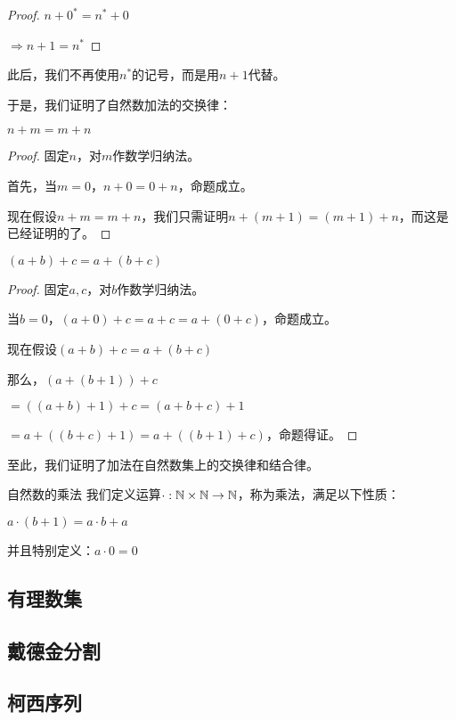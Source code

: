 \documentclass[12pt, a4paper, oneside, UTF8]{ctexbook}
\begin{document}
\begin{para}{0}
\begin{proof}
						$n+0^*=n^*+0$
						
						$\Rightarrow n+1=n^*$
					\end{proof}
					此后，我们不再使用$n^*$的记号，而是用$n+1$代替。
					
					于是，我们证明了自然数加法的交换律：
					\begin{proposition}
						$n+m=m+n$
					\end{proposition}
					\begin{proof}
						固定$n$，对$m$作数学归纳法。
						
						首先，当$m=0$，$n+0=0+n$，命题成立。
						
						现在假设$n+m=m+n$，我们只需证明$n+(m+1)=(m+1)+n$，而这是已经证明的了。
					\end{proof}
					\begin{proposition}
						$(a+b)+c=a+(b+c)$
					\end{proposition}
					\begin{proof}
						固定$a,c$，对$b$作数学归纳法。
						
						当$b=0$，$(a+0)+c=a+c=a+(0+c)$，命题成立。
						
						现在假设$(a+b)+c=a+(b+c)$
						
						那么，$\left(a+(b+1)\right)+c$
						
						$=\left((a+b)+1\right)+c=(a+b+c)+1$
						
						$=a+\left((b+c)+1\right)=a+\left((b+1)+c\right)$，命题得证。
					\end{proof}
					至此，我们证明了加法在自然数集上的交换律和结合律。
					\begin{defn}{自然数的乘法}
						我们定义运算$\cdot : \mathbb{N} \times \mathbb{N} \rightarrow \mathbb{N}$，称为乘法，满足以下性质：
						
						$a \cdot (b+1) = a\cdot b + a$
						
						并且特别定义：$a \cdot 0 = 0$
					\end{defn}
			\end{para}
		\subsection{有理数集}
		\subsection{戴德金分割}
		\subsection{柯西序列}
\end{document}
